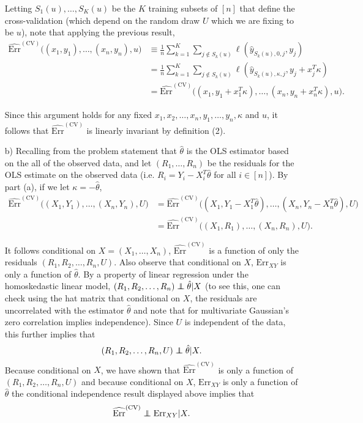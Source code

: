 \begin{enumerate}
Letting $S_1(u),\dots,S_K(u)$ be the $K$ training subsets of $[n]$ that define the cross-validation (which depend on the random draw $U$ which we are fixing to be $u$), note that applying the previous result, $$\begin{aligned}
\widehat{\text{Err}}^{(\text{CV})} \Big( (x_1,y_1), \dots, (x_n,y_n),u \Big) & \equiv \frac{1}{n} \sum_{k=1}^K \sum_{j \notin S_k(u)  } \ell(\hat{y}_{S_k(u),0,j},y_j)
\\ & =  \frac{1}{n} \sum_{k=1}^K \sum_{j \notin S_k(u)  } \ell(\hat{y}_{S_k(u),\kappa,j},y_j+x_j^T \kappa)
\\ & = \widehat{\text{Err}}^{(\text{CV})} \Big( (x_1,y_1+x_1^T \kappa), \dots, (x_n,y_n +x_n^T \kappa),u \Big).
 \end{aligned}$$
 
 Since this argument holds for any fixed $x_1,x_2, \dots,x_n, y_1,\dots,y_n, \kappa$ and $u$, it follows that $\widehat{\text{Err}}^{(\text{CV})}$ is linearly invariant by definition (2).

\item[b)] Recalling from the problem statement that $\hat{\theta}$ is the OLS estimator based on the all of the observed data, and let $(R_1,\dots,R_n)$ be the residuals for the OLS estimate on the observed data (i.e. $R_i=Y_i -X_i^T \hat{\theta}$ for all $i \in [n]$). By part (a), if we let $\kappa = - \hat{\theta}$, 
$$\begin{aligned} \widehat{\text{Err}}^{(\text{CV})} \Big( (X_1,Y_1), \dots, (X_n,Y_n),U \Big) & = \widehat{\text{Err}}^{(\text{CV})} \Big( (X_1,Y_1 -X_1^T \hat{\theta}), \dots, (X_n, Y_n-X_n^T \hat{\theta}),U \Big) 
\\ & = \widehat{\text{Err}}^{(\text{CV})} \Big( (X_1,R_1), \dots, (X_n,R_n),U \Big) .\end{aligned}$$

It follows conditional on $X=(X_1,\dots,X_n)$, $\widehat{\text{Err}}^{(\text{CV})} $ is a function of only the residuals $(R_1,R_2, \dots,R_n,U)$. Also observe that conditional on $X$, $\text{Err}_{XY}$ is only a function of $\hat{\theta}$. By a property of linear regression under the homoskedastic linear model, $(R_1,R_2,\dots,R_n) \independent \hat{\theta} | X$ (to see this, one can check using the hat matrix that conditional on $X$, the residuals are uncorrelated with the estimator $\hat{\theta}$ and note that for multivariate Gaussian's zero correlation implies independence). Since $U$ is independent of the data, this further implies that  $$(R_1,R_2,\dots,R_n,U) \independent \hat{\theta} | X.$$ Because conditional on $X$, we have shown that $\widehat{\text{Err}}^{(\text{CV})} $ is only a function of $(R_1,R_2, \dots,R_n,U)$ and because conditional on $X$, $\text{Err}_{XY}$ is only a function of $\hat{\theta}$ the conditional independence result displayed above implies that $$\widehat{\text{Err}}^{(\text{CV})} \independent \text{Err}_{XY} | X.$$


\end{enumerate}
